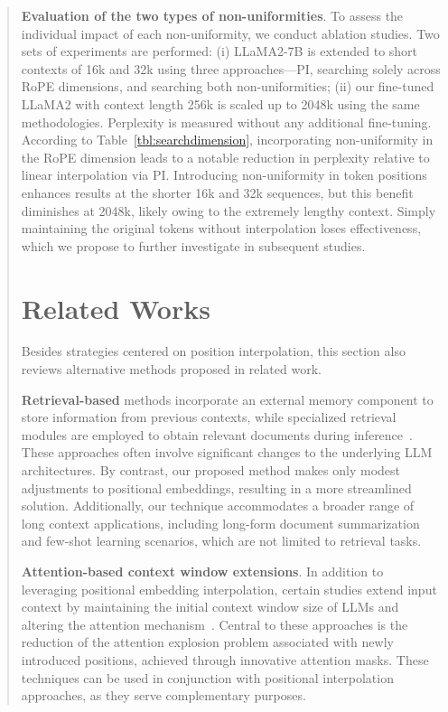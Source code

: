 \begin{abstract}
\textbf{Evaluation of the two types of non-uniformities}. To assess the individual impact of each non-uniformity, we conduct ablation studies. Two sets of experiments are performed: (i) LLaMA2-7B is extended to short contexts of 16k and 32k using three approaches—PI, searching solely across RoPE dimensions, and searching both non-uniformities; (ii) our fine-tuned LLaMA2 with context length 256k is scaled up to 2048k using the same methodologies. Perplexity is measured without any additional fine-tuning. According to Table~\ref{tbl:searchdimension}, incorporating non-uniformity in the RoPE dimension leads to a notable reduction in perplexity relative to linear interpolation via PI. Introducing non-uniformity in token positions enhances results at the shorter 16k and 32k sequences, but this benefit diminishes at 2048k, likely owing to the extremely lengthy context. Simply maintaining the original tokens without interpolation loses effectiveness, which we propose to further investigate in subsequent studies.

\section{Related Works}

Besides strategies centered on position interpolation, this section also reviews alternative methods proposed in related work.

\textbf{Retrieval-based} methods incorporate an external memory component to store information from previous contexts, while specialized retrieval modules are employed to obtain relevant documents during inference~\cite{longllama,wang2023augmenting,borgeaud2022improving}. These approaches often involve significant changes to the underlying LLM architectures. By contrast, our proposed method makes only modest adjustments to positional embeddings, resulting in a more streamlined solution. Additionally, our technique accommodates a broader range of long context applications, including long-form document summarization and few-shot learning scenarios, which are not limited to retrieval tasks.

\textbf{Attention-based context window extensions}. In addition to leveraging positional embedding interpolation, certain studies extend input context by maintaining the initial context window size of LLMs and altering the attention mechanism~\cite{han2023lminfinite, streamingllm,parallelwindow}. Central to these approaches is the reduction of the attention explosion problem associated with newly introduced positions, achieved through innovative attention masks. These techniques can be used in conjunction with positional interpolation approaches, as they serve complementary purposes.


\end{abstract}

